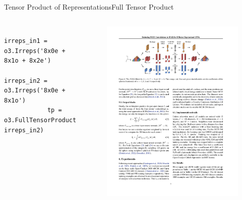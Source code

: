 \documentclass[pdf,serif]{beamer}
\begin{document}
\begin{frame}[fragile]{Tensor Product of Representations}{Full Tensor Product}
\begin{columns}
\begin{verbatim}
            irreps_in1 = o3.Irreps('8x0e + 8x1o + 8x2e') 
            irreps_in2 = o3.Irreps('8x0e + 8x1o')
            tp = o3.FullTensorProduct(irreps_in1, irreps_in2)
        \end{verbatim}
        \vspace*{1em}
        \begin{figure}
            \includegraphics[width=0.7\linewidth]{images/tensor.pdf}
        \end{figure}
    \end{columns}
\end{frame}
\end{document}
